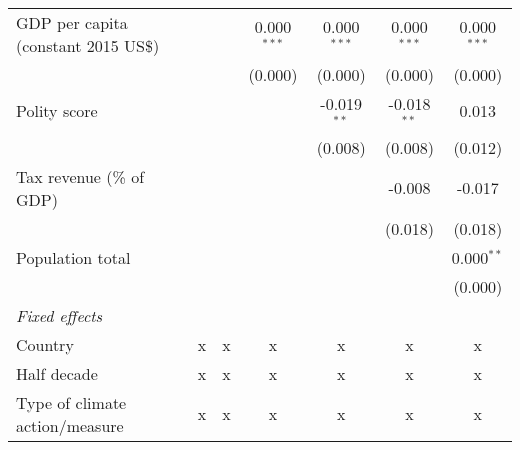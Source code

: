 \begin{tabular}{lcccccc}
   GDP per capita (constant 2015 US\$)                                                                &         &                & 0.000$^{***}$  & 0.000$^{***}$  & 0.000$^{***}$  & 0.000$^{***}$\\   
                                                                                                      &         &                & (0.000)        & (0.000)        & (0.000)        & (0.000)\\   
   Polity score                                                                                       &         &                &                & -0.019$^{**}$  & -0.018$^{**}$  & 0.013\\   
                                                                                                      &         &                &                & (0.008)        & (0.008)        & (0.012)\\   
   Tax revenue (\% of GDP)                                                                            &         &                &                &                & -0.008         & -0.017\\   
                                                                                                      &         &                &                &                & (0.018)        & (0.018)\\   
   Population total                                                                                   &         &                &                &                &                & 0.000$^{**}$\\   
                                                                                                      &         &                &                &                &                & (0.000)\\   
   \emph{Fixed effects}\\
   Country                                                                                            & x       & x              & x              & x              & x              & x\\  
   Half decade                                                                                        & x       & x              & x              & x              & x              & x\\  
   Type of climate action/measure                                                                     & x       & x              & x              & x              & x              & x\\  

\end{tabular}
